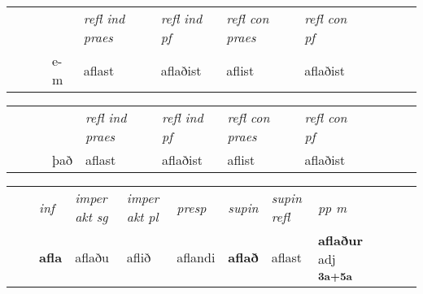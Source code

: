 \begin{tabular}{llllllllllll}
 & &  & &  \textit{refl ind praes} & \textit{refl ind pf} & \textit{refl con praes} & \textit{refl con pf} \\*
&  & & e-m & aflast & aflaðist & aflist & aflaðist \\*
\cmidrule{5-9}
\end{tabular}


\begin{tabular}{llllllllllll}
 & &  & &  \textit{refl ind praes} & \textit{refl ind pf} & \textit{refl con praes} & \textit{refl con pf} \\*
 & &  & það & aflast & aflaðist & aflist & aflaðist \\*
\cmidrule{5-9}
\end{tabular}


\begin{tabular}{llllllllllll}
 & & \textit{inf} & \textit{imper akt sg} & \textit{imper akt pl}   & \textit{presp} & \textit{supin} & \textit{supin refl} & \textit{pp m}     \\*
  & & \textbf{afla} & aflaðu  & aflið   & aflandi &  \textbf{aflað} & aflast & \textbf{aflaður} adj \textbf{\textsubscript{3a+5a}} \\*
\cmidrule{1-12}
\end{tabular}



